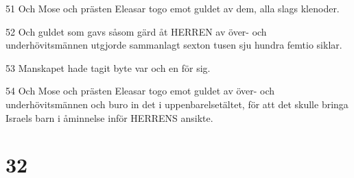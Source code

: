 \par 51 Och Mose och prästen Eleasar togo emot guldet av dem, alla slags klenoder.
\par 52 Och guldet som gavs såsom gärd åt HERREN av över- och underhövitsmännen utgjorde sammanlagt sexton tusen sju hundra femtio siklar.
\par 53 Manskapet hade tagit byte var och en för sig.
\par 54 Och Mose och prästen Eleasar togo emot guldet av över- och underhövitsmännen och buro in det i uppenbarelsetältet, för att det skulle bringa Israels barn i åminnelse inför HERRENS ansikte.

\chapter{32}

